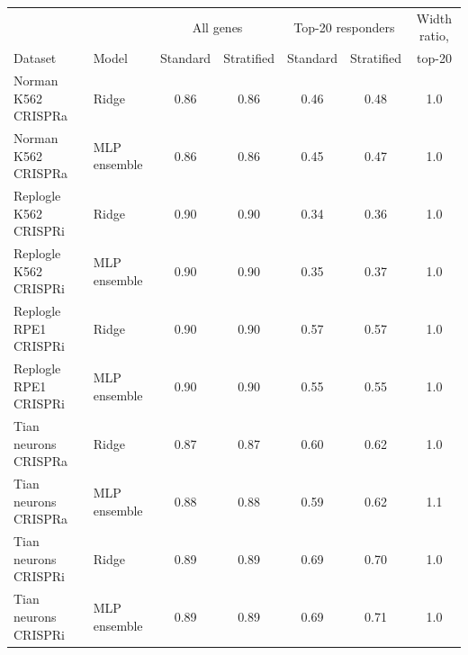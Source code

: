 \begin{tabular}{llccccc}
\toprule
 & & \multicolumn{2}{c}{All genes} & \multicolumn{2}{c}{Top-20 responders} & Width ratio, \\
Dataset & Model & Standard & Stratified & Standard & Stratified & top-20 \\
\midrule
Norman K562 CRISPRa & Ridge & 0.86 & 0.86 & 0.46 & 0.48 & 1.0 \\
Norman K562 CRISPRa & MLP ensemble & 0.86 & 0.86 & 0.45 & 0.47 & 1.0 \\
Replogle K562 CRISPRi & Ridge & 0.90 & 0.90 & 0.34 & 0.36 & 1.0 \\
Replogle K562 CRISPRi & MLP ensemble & 0.90 & 0.90 & 0.35 & 0.37 & 1.0 \\
Replogle RPE1 CRISPRi & Ridge & 0.90 & 0.90 & 0.57 & 0.57 & 1.0 \\
Replogle RPE1 CRISPRi & MLP ensemble & 0.90 & 0.90 & 0.55 & 0.55 & 1.0 \\
Tian neurons CRISPRa & Ridge & 0.87 & 0.87 & 0.60 & 0.62 & 1.0 \\
Tian neurons CRISPRa & MLP ensemble & 0.88 & 0.88 & 0.59 & 0.62 & 1.1 \\
Tian neurons CRISPRi & Ridge & 0.89 & 0.89 & 0.69 & 0.70 & 1.0 \\
Tian neurons CRISPRi & MLP ensemble & 0.89 & 0.89 & 0.69 & 0.71 & 1.0 \\
\bottomrule
\end{tabular}